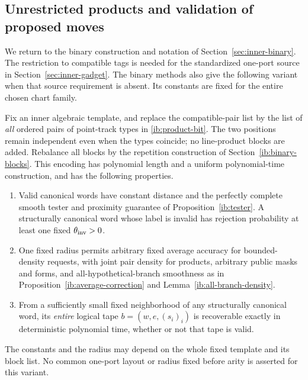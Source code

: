 \subsection{Unrestricted products and validation of proposed moves}
\label{ib:unrestricted-variants}

We return to the binary construction and notation of
Section~\ref{sec:inner-binary}. The restriction to compatible tags is
needed for the standardized one-port source in
Section~\ref{sec:inner-gadget}. The binary methods
also give the following variant when that source requirement is absent.
Its constants are fixed for the entire chosen chart family.

\begin{proposition}
\label{ib:all-pairs-interface}
Fix an inner algebraic template, and replace the compatible-pair list
by the list of \emph{all} ordered pairs of point-track types in
\eqref{ib:product-bit}. The two positions remain independent even
when the types coincide; no line-product blocks are added. Rebalance all blocks by the repetition construction of
Section~\ref{ib:binary-blocks}. This encoding has polynomial length and a
uniform polynomial-time construction, and has the following properties.
\begin{enumerate}[label=(\roman*)]
\item Valid canonical words have constant distance and the perfectly
complete smooth tester and proximity guarantee of
Proposition~\ref{ib:tester}. A structurally canonical word whose
label is invalid has rejection probability at least one fixed
\(\theta_{\rm inv}>0\).
\item One fixed radius permits arbitrary fixed average accuracy for
bounded-density requests, with joint pair density for products,
arbitrary public masks and forms, and all-hypothetical-branch
smoothness as in Proposition~\ref{ib:average-correction} and
Lemma~\ref{ib:all-branch-density}.
\item From a sufficiently small fixed neighborhood of any structurally
canonical word, its \emph{entire} logical tape
\(b=(w,e,(s_i)_i)\) is recoverable exactly in deterministic polynomial
time, whether or not that tape is valid.
\end{enumerate}
The constants and the radius may depend on the whole fixed template
and its block list. No common one-port layout or radius fixed before
arity is asserted for this variant.


\end{proposition}
